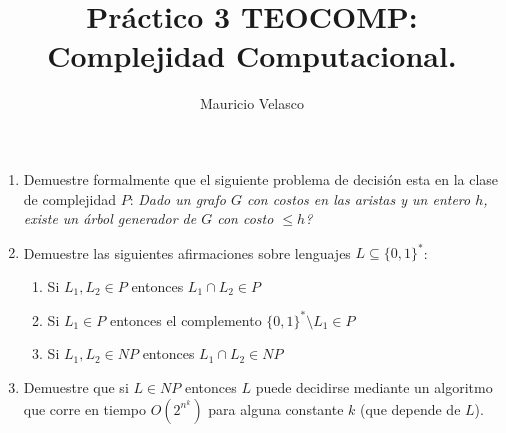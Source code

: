 \documentclass[12pt, a4paper]{article}
\date{}
\begin{document}
\title{Pr\'actico 3 TEOCOMP: Complejidad Computacional.}
\author{Mauricio Velasco}
\maketitle{}


\begin{enumerate}
\item Demuestre formalmente que el siguiente problema de decisión esta en la clase de complejidad $P$: {\it Dado un grafo $G$ con costos en las aristas y un entero $h$, existe un árbol generador de $G$ con costo $\leq h$?}

\item Demuestre las siguientes afirmaciones sobre lenguajes $L\subseteq \{0,1\}^*$:
\begin{enumerate}
\item Si $L_1,L_2\in P$ entonces $L_1\cap L_2\in P$
\item Si $L_1 \in P$ entonces el complemento $\{0,1\}^*\setminus L_1\in P$
\item Si $L_1,L_2\in NP$ entonces $L_1\cap L_2\in NP$
\end{enumerate}

\item Demuestre que si $L\in NP$ entonces $L$ puede decidirse mediante un algoritmo que corre en tiempo $O(2^{n^k})$ para alguna constante $k$ (que depende de $L$).


\end{enumerate}
\end{document}
